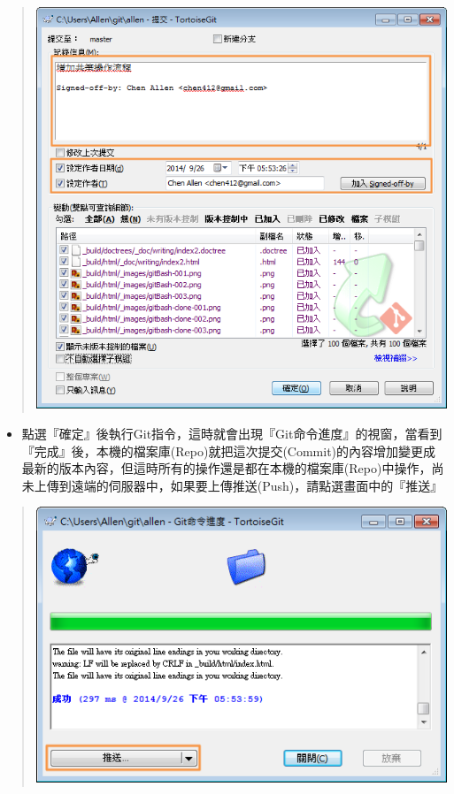 \documentclass[letterpaper,10pt,english]{sphinxmanual}
\begin{document}
\begin{quote}

\includegraphics{tortoisegit-push-004.png}
\end{quote}
\begin{itemize}
\item {} 
點選『確定』後執行Git指令，這時就會出現『Git命令進度』的視窗，當看到『完成』後，本機的檔案庫(Repo)就把這次提交(Commit)的內容增加變更成最新的版本內容，但這時所有的操作還是都在本機的檔案庫(Repo)中操作，尚未上傳到遠端的伺服器中，如果要上傳推送(Push)，請點選畫面中的『推送』

\end{itemize}
\begin{quote}

\includegraphics{tortoisegit-push-005.png}
\end{quote}
\end{document}
